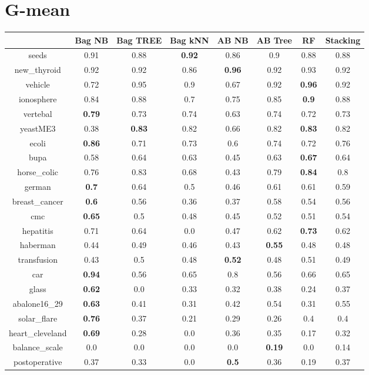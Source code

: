 \documentclass{article}%
\begin{document}
\section*{G{-}mean}%
\begin{tabular}{c|ccccccc}%
&Bag NB&Bag TREE&Bag kNN&AB NB&AB Tree&RF&Stacking\\%
\hline%
seeds&0.91&0.88&\textbf{0.92}&0.86&0.9&0.88&0.88\\%
new\_thyroid&0.92&0.92&0.86&\textbf{0.96}&0.92&0.93&0.92\\%
vehicle&0.72&0.95&0.9&0.67&0.92&\textbf{0.96}&0.92\\%
ionosphere&0.84&0.88&0.7&0.75&0.85&\textbf{0.9}&0.88\\%
vertebal&\textbf{0.79}&0.73&0.74&0.63&0.74&0.72&0.73\\%
yeastME3&0.38&\textbf{0.83}&0.82&0.66&0.82&\textbf{0.83}&0.82\\%
ecoli&\textbf{0.86}&0.71&0.73&0.6&0.74&0.72&0.76\\%
bupa&0.58&0.64&0.63&0.45&0.63&\textbf{0.67}&0.64\\%
horse\_colic&0.76&0.83&0.68&0.43&0.79&\textbf{0.84}&0.8\\%
german&\textbf{0.7}&0.64&0.5&0.46&0.61&0.61&0.59\\%
breast\_cancer&\textbf{0.6}&0.56&0.36&0.37&0.58&0.54&0.56\\%
cmc&\textbf{0.65}&0.5&0.48&0.45&0.52&0.51&0.54\\%
hepatitis&0.71&0.64&0.0&0.47&0.62&\textbf{0.73}&0.62\\%
haberman&0.44&0.49&0.46&0.43&\textbf{0.55}&0.48&0.48\\%
transfusion&0.43&0.5&0.48&\textbf{0.52}&0.48&0.51&0.49\\%
car&\textbf{0.94}&0.56&0.65&0.8&0.56&0.66&0.65\\%
glass&\textbf{0.62}&0.0&0.33&0.32&0.38&0.24&0.37\\%
abalone16\_29&\textbf{0.63}&0.41&0.31&0.42&0.54&0.31&0.55\\%
solar\_flare&\textbf{0.76}&0.37&0.21&0.29&0.26&0.4&0.4\\%
heart\_cleveland&\textbf{0.69}&0.28&0.0&0.36&0.35&0.17&0.32\\%
balance\_scale&0.0&0.0&0.0&0.0&\textbf{0.19}&0.0&0.14\\%
postoperative&0.37&0.33&0.0&\textbf{0.5}&0.36&0.19&0.37\\%
\end{tabular}

%
\end{document}
